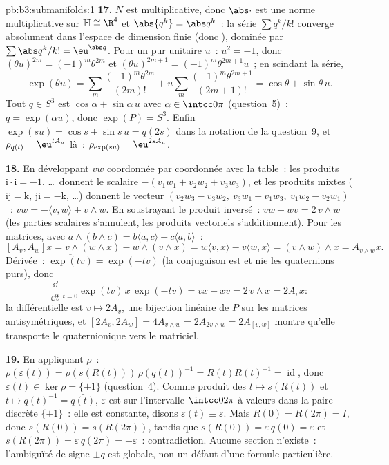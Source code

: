 \begin{solution}{pb:b3:submanifolds:1}
\textbf{17.} $N$ est multiplicative, donc $\abs\cdot$ est
une norme multiplicative sur $\mathbb H \cong \R^4$ et
$\abs{q^k} = \abs q^k$~: la série $\sum q^k/k!$ converge
absolument dans l'espace de dimension finie (donc
), dominée par $\sum\abs q^k/k! = \eu^{\abs q}$.
Pour un pur unitaire $u$~: $u^2 = -1$, donc $(\theta
u)^{2m} = (-1)^m\theta^{2m}$ et $(\theta u)^{2m+1} =
(-1)^m\theta^{2m+1}u$~; en scindant la série,
\[
\exp(\theta u) = \sum_m\frac{(-1)^m\theta^{2m}}{(2m)!} +
u\sum_m\frac{(-1)^m\theta^{2m+1}}{(2m+1)!} = \cos\theta +
\sin\theta\,u .
\]
Tout $q \in S^3$ est $\cos\alpha + \sin\alpha\,u$ avec
$\alpha \in \intcc0\pi$ (question~5)~: $q = \exp(\alpha
u)$, donc $\exp(P) = S^3$. Enfin $\exp(su) = \cos s + \sin
s\,u = q(2s)$ dans la notation de la question~9, et
$\rho_{q(t)} = \eu^{tA_u}$ là~: $\rho_{\exp(su)} =
\eu^{2sA_u}$.

\textbf{18.} En développant $vw$ coordonnée par coordonnée
avec la table~: les produits $\mathrm i\cdot\mathrm i =
-1$, \dots\ donnent le scalaire $-(v_1w_1 + v_2w_2 +
v_3w_3)$, et les produits mixtes ($\mathrm{ij} = \mathrm
k$, $\mathrm{ji} = -\mathrm k$, \dots) donnent le vecteur
$(v_2w_3 - v_3w_2,\ v_3w_1 - v_1w_3,\ v_1w_2 - v_2w_1)$~:
$vw = -\langle v, w\rangle + v\wedge w$. En soustrayant le
produit inversé~: $vw - wv = 2\,v\wedge w$ (les parties
scalaires s'annulent, les produits vectoriels
s'additionnent). Pour les matrices, avec $a\wedge(b\wedge
c) = b\langle a, c\rangle - c\langle a, b\rangle$~:
\[
[A_v, A_w]x = v\wedge(w\wedge x) - w\wedge(v\wedge x)
= w\langle v, x\rangle - v\langle w, x\rangle
= (v\wedge w)\wedge x = A_{v\wedge w}x .
\]
Dérivée~: $\overline{\exp(tv)} = \exp(-tv)$ (la conjugaison
est  et nie les quaternions purs), donc
\[
\frac{\dd}{\dd t}\Bigr|_{t=0}\exp(tv)\,x\,\exp(-tv) = vx -
xv = 2\,v\wedge x = 2A_vx :
\]
la différentielle est $v \mapsto 2A_v$, une bijection
linéaire de $P$ sur les matrices antisymétriques, et $[2A_v,
2A_w] = 4A_{v\wedge w} = 2A_{2v\wedge w} =
2A_{[v,w]}$ montre qu'elle transporte le 
quaternionique vers le  matriciel.

\textbf{19.} En appliquant $\rho$~: $\rho(\varepsilon(t)) =
\rho(s(R(t)))\,\rho(q(t))^{-1} = R(t)R(t)^{-1} =
\operatorname{id}$, donc $\varepsilon(t) \in \ker\rho =
\{\pm1\}$ (question~4). Comme produit des  $t \mapsto s(R(t))$ et $t \mapsto q(t)^{-1} =
\bar{q(t)}$, $\varepsilon$ est  sur l'intervalle
 $\intcc0{2\pi}$ à valeurs dans la paire discrète
$\{\pm1\}$~: elle est constante, disons $\varepsilon(t)
\equiv \varepsilon$. Mais $R(0) = R(2\pi) = I$, donc
$s(R(0)) = s(R(2\pi))$, tandis que $s(R(0)) =
\varepsilon\,q(0) = \varepsilon$ et $s(R(2\pi)) =
\varepsilon\,q(2\pi) = -\varepsilon$~: contradiction. Aucune
section  n'existe~: l'ambiguïté de signe $\pm q$
est globale, non un défaut d'une formule particulière.


\end{solution}
